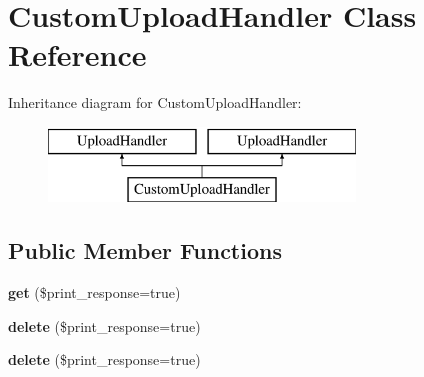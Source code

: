 \hypertarget{class_custom_upload_handler}{\section{Custom\-Upload\-Handler Class Reference}
\label{class_custom_upload_handler}
}
Inheritance diagram for Custom\-Upload\-Handler\-:\begin{figure}[H]
\begin{center}
\leavevmode
\includegraphics[height=2.000000cm]{class_custom_upload_handler}
\end{center}
\end{figure}
\subsection*{Public Member Functions}
\begin{DoxyCompactItemize}
\item 
\hypertarget{class_custom_upload_handler_a0a331b917926812f7b7e8ac17e818b8f}{{\bfseries get} (\$print\-\_\-response=true)}\label{class_custom_upload_handler_a0a331b917926812f7b7e8ac17e818b8f}

\item 
\hypertarget{class_custom_upload_handler_ac5e612121fb999f225cb5db1b6f72cf6}{{\bfseries delete} (\$print\-\_\-response=true)}\label{class_custom_upload_handler_ac5e612121fb999f225cb5db1b6f72cf6}

\item 
\hypertarget{class_custom_upload_handler_ac5e612121fb999f225cb5db1b6f72cf6}{{\bfseries delete} (\$print\-\_\-response=true)}\label{class_custom_upload_handler_ac5e612121fb999f225cb5db1b6f72cf6}

\end{DoxyCompactItemize}
